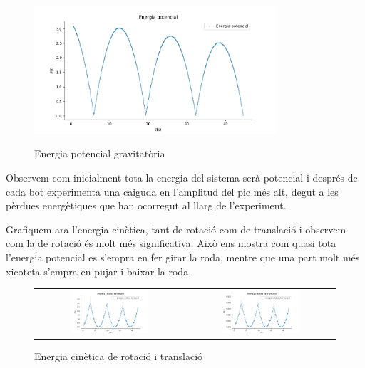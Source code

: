 \documentclass[11pt]{article}
\begin{document}
    \begin{figure}[h]
        \vspace{-0.2cm}
        \begin{center}
            \includegraphics[width=0.8\textwidth]{fotos/energias/u.png}
            \label{fig:u}
            \caption{Energia potencial gravitatòria}
        \end{center}
    \end{figure}

    Observem com inicialment tota la energia del sistema serà potencial i després de cada bot experimenta una caiguda en l'amplitud del pic més alt, degut a les pèrdues energètiques que han ocorregut al llarg de l'experiment.

    \vspace{0.4cm}Grafiquem ara l'energia cinètica, tant de rotació com de translació i observem com la de rotació és molt més significativa. Això ens mostra com quasi tota l'energia potencial es s'empra en fer girar la roda, mentre que una part molt més xicoteta s'empra en pujar i baixar la roda.

    \begin{figure}[h]
        \vspace{-0.2cm}
        \begin{center}
            \begin{tabular}{c c}
                \hspace{-1.15cm}
                \includegraphics[width=0.55\textwidth]{fotos/energias/kr.png} & \includegraphics[width=0.55\textwidth]{fotos/energias/kt.png}
            \label{fig:ks}
            \end{tabular}
            \caption{Energia cinètica de rotació i translació}
        \end{center}
    \end{figure}
    \clearpage
\end{document}
